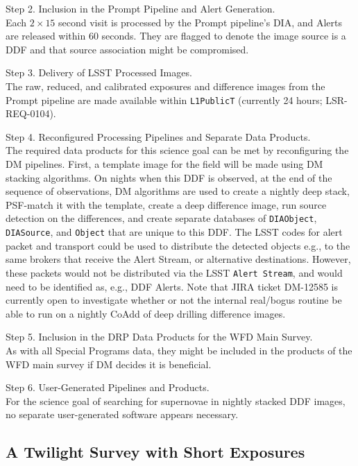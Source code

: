 \documentclass[DM,lsstdoc,toc]{lsstdoc}
\begin{document}
Step 2. Inclusion in the Prompt Pipeline and Alert Generation. \\
Each $2\times15$ second visit is processed by the Prompt pipeline's DIA, and Alerts are released within 60 seconds. They are flagged to denote the image source is a DDF and that source association might be compromised.

Step 3. Delivery of LSST Processed Images. \\
The raw, reduced, and calibrated exposures and difference images from the Prompt pipeline are made available within \texttt{L1PublicT} (currently 24 hours; LSR-REQ-0104).

Step 4. Reconfigured Processing Pipelines and Separate Data Products. \\
The required data products for this science goal can be met by reconfiguring the DM pipelines. First, a template image for the field will be made using DM stacking algorithms. On nights when this DDF is observed, at the end of the sequence of observations, DM algorithms are used to create a nightly deep stack, PSF-match it with the template, create a deep difference image, run source detection on the differences, and create separate databases of \texttt{DIAObject}, \texttt{DIASource}, and \texttt{Object} that are unique to this DDF. The LSST codes for alert packet and transport could be used to distribute the detected objects e.g., to the same brokers that receive the Alert Stream, or alternative destinations. However, these packets would not be distributed via the LSST {\tt Alert Stream}, and would need to be identified as, e.g., DDF Alerts. Note that JIRA ticket DM-12585 is currently open to investigate whether or not the internal real/bogus routine be able to run on a nightly CoAdd of deep drilling difference images.

Step 5. Inclusion in the DRP Data Products for the WFD Main Survey. \\
As with all Special Programs data, they might be included in the products of the WFD main survey if DM decides it is beneficial.

Step 6. User-Generated Pipelines and Products. \\
For the science goal of searching for supernovae in nightly stacked DDF images, no separate user-generated software appears necessary.


\subsection{A Twilight Survey with Short Exposures}\label{ssec:SPCS_Twilight}
\end{document}
